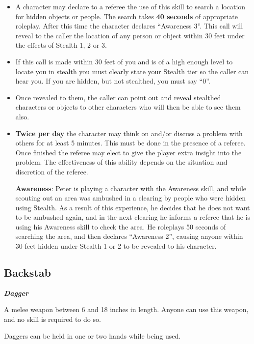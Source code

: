 \begin{itemize}
\item A character may declare to a referee the use of this skill to search a location for hidden objects or people. The search takes \textbf{40 seconds} of appropriate roleplay. After this time the character declares ``Awareness 3''. This call will reveal to the caller the location of any person or object within 30 feet under the effects of Stealth 1, 2 or 3.

\item If this call is made within 30 feet of you and is of a high enough level to locate you in stealth you must clearly state your Stealth tier so the caller can hear you. If you are hidden, but not stealthed, you must say ``0''.

\item Once revealed to them, the caller can point out and reveal stealthed characters or objects to other characters who will then be able to see them also.

\item \textbf{Twice per day} the character may think on and/or discuss a problem with others for at least 5 minutes. This must be done in the presence of a referee. Once finished the referee may elect to give the player extra insight into the problem. The effectiveness of this ability depends on the situation and discretion of the referee.

\textbf{Awareness}: Peter is playing a character with the Awareness skill, and while scouting out an area was ambushed in a clearing by people who were hidden using Stealth. As a result of this experience, he decides that he does not want to be ambushed again, and in the next clearing he informs a referee that he is using his Awareness skill to check the area. He roleplays 50 seconds of searching the area, and then declares ``Awareness 2'', causing anyone within 30 feet hidden under Stealth 1 or 2 to be revealed to his character.

\end{itemize}

\subsection{Backstab}

\textbf{\textit{Dagger}}

A melee weapon between 6 and 18 inches in length. Anyone can use this weapon, and no skill is required to do so.

Daggers can be held in one or two hands while being used.

